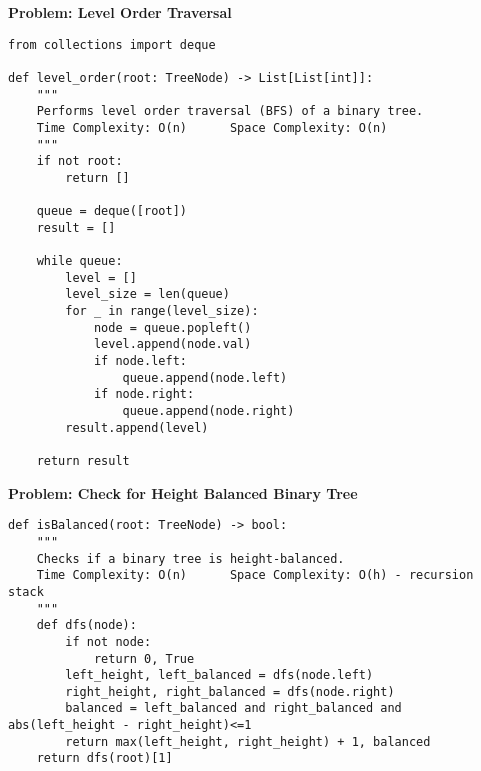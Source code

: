 \noindent\textbf{Problem: Level Order Traversal}
\begin{verbatim}
from collections import deque

def level_order(root: TreeNode) -> List[List[int]]:
    """
    Performs level order traversal (BFS) of a binary tree.
    Time Complexity: O(n)      Space Complexity: O(n)
    """
    if not root:
        return []
    
    queue = deque([root])
    result = []
    
    while queue:
        level = []
        level_size = len(queue)
        for _ in range(level_size):
            node = queue.popleft()
            level.append(node.val)
            if node.left:
                queue.append(node.left)
            if node.right:
                queue.append(node.right)
        result.append(level)
    
    return result
\end{verbatim}
\noindent\textbf{Problem: Check for Height  Balanced Binary Tree}
\begin{verbatim}
def isBalanced(root: TreeNode) -> bool:
    """
    Checks if a binary tree is height-balanced.
    Time Complexity: O(n)      Space Complexity: O(h) - recursion stack
    """
    def dfs(node):
        if not node:
            return 0, True
        left_height, left_balanced = dfs(node.left)
        right_height, right_balanced = dfs(node.right)
        balanced = left_balanced and right_balanced and abs(left_height - right_height)<=1
        return max(left_height, right_height) + 1, balanced
    return dfs(root)[1]
\end{verbatim}

